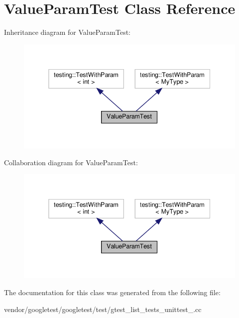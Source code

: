 \hypertarget{class_value_param_test}{}\section{Value\+Param\+Test Class Reference}
\label{class_value_param_test}


Inheritance diagram for Value\+Param\+Test\+:
\nopagebreak
\begin{figure}[H]
\begin{center}
\leavevmode
\includegraphics[width=338pt]{class_value_param_test__inherit__graph}
\end{center}
\end{figure}


Collaboration diagram for Value\+Param\+Test\+:
\nopagebreak
\begin{figure}[H]
\begin{center}
\leavevmode
\includegraphics[width=338pt]{class_value_param_test__coll__graph}
\end{center}
\end{figure}


The documentation for this class was generated from the following file\+:\begin{DoxyCompactItemize}
\item 
vendor/googletest/googletest/test/gtest\+\_\+list\+\_\+tests\+\_\+unittest\+\_\+.\+cc\end{DoxyCompactItemize}

